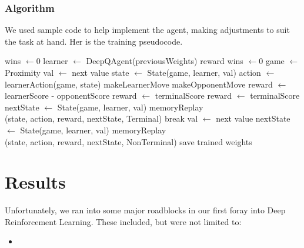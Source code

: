 \documentclass[letterpaper]{article}
\begin{document}
\subsubsection{Algorithm}
We used sample code to help implement the agent, making adjustments to suit the task at hand\cite{keon}. Her is the training pseudocode.
\begin{algorithmic}[1]
\State wins $\gets 0$
\State learner $\gets$ DeepQAgent(previousWeights)
\State reward wins $\gets 0$
\State game $\gets$ Proximity
\State val $\gets$ next value
\State state $\gets$ State(game, learner, val)
\State action $\gets$  learnerAction(game, state)
\State makeLearnerMove
\State makeOpponentMove
\State reward $\gets$ learnerScore - opponentScore
\normalsize
\State reward $\gets$ terminalScore
\State \normalsize reward $\gets$ terminalScore
\EndIf
\State nextState $\gets$ State(game, learner, val)
\State memoryReplay\\(state, action, reward, nextState, Terminal)
\State break
\EndIf
\State val $\gets$ next value
\State nextState $\gets$ State(game, learner, val)
\State memoryReplay\\(state, action, reward, nextState, NonTerminal)
\EndWhile
\EndFor
\State save trained weights
\EndFor
\EndProcedure
\end{algorithmic}
\section{Results}
Unfortunately, we ran into some major roadblocks in our first foray into Deep Reinforcement Learning. These included, but were not limited to:
\begin{itemize}
\item
\end{itemize}
\printbibliography
\end{document}
